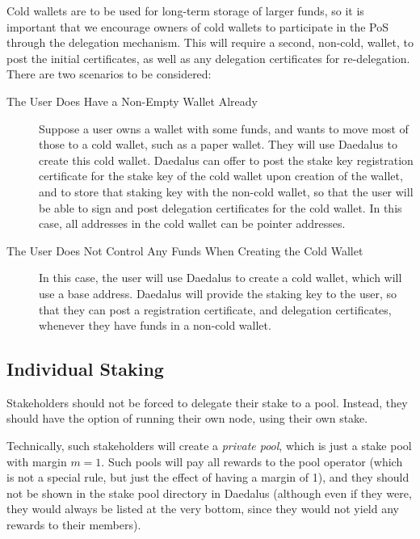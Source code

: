\documentclass[11pt,a4paper]{article}
\begin{document}
Cold wallets are to be used for long-term storage of larger funds, so
it is important that we encourage owners of cold wallets to
participate in the PoS through the delegation mechanism. This will
require a second, non-cold, wallet, to post the initial certificates,
as well as any delegation certificates for re-delegation. There are
two scenarios to be considered:

\begin{description}
\item[The User Does Have a Non-Empty Wallet Already] Suppose a user
  owns a wallet with some funds, and wants to move most of those to a
  cold wallet, such as a paper wallet. They will use Daedalus to
  create this cold wallet. Daedalus can offer to post the stake key
  registration certificate for the stake key of the cold wallet upon
  creation of the wallet, and to store that staking key with the
  non-cold wallet, so that the user will be able to sign and post
  delegation certificates for the cold wallet. In this case, all
  addresses in the cold wallet can be pointer addresses.
\item[The User Does Not Control Any Funds When Creating the Cold
  Wallet] In this case, the user will use Daedalus to create a cold
  wallet, which will use a base address. Daedalus will provide the
  staking key to the user, so that they can post a registration
  certificate, and delegation certificates, whenever they have funds
  in a non-cold wallet.
\end{description}

\subsection{Individual Staking}
\label{individual-staking}

Stakeholders should not be forced to delegate their stake to a
pool. Instead, they should have the option of running their own node,
using their own stake.

Technically, such stakeholders will create a \emph{private pool},
which is just a stake pool with margin \(m=1\). Such pools will
pay all rewards to the pool operator (which is not a special rule, but
just the effect of having a margin of 1), and they should not be shown
in the stake pool directory in Daedalus (although even if they were,
they would always be listed at the very bottom, since they would not
yield any rewards to their members).
\end{document}
